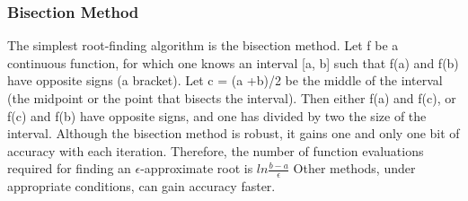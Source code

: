 \documentclass{article}
\begin{document}
\subsubsection{Bisection Method}
The simplest root-finding algorithm is the bisection method. Let f be a continuous function, for which one knows an interval [a, b] such that f(a) and f(b) have opposite signs (a bracket). Let c = (a +b)/2 be the middle of the interval (the midpoint or the point that bisects the interval). Then either f(a) and f(c), or f(c) and f(b) have opposite signs, and one has divided by two the size of the interval. Although the bisection method is robust, it gains one and only one bit of accuracy with each iteration. Therefore, the number of function evaluations required for finding an $\epsilon$-approximate root is $ln \frac{b-a}{\epsilon}$
 Other methods, under appropriate conditions, can gain accuracy faster.
\end{document}
